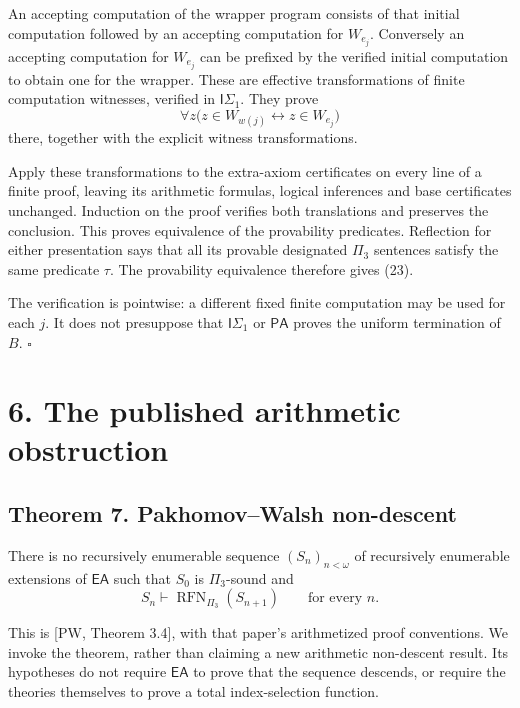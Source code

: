 \documentclass[
  11pt,
  letterpaper,
]{article}
\begin{document}
An accepting computation of the wrapper program consists of that initial
computation followed by an accepting computation for \(W_{e_j}\).
Conversely an accepting computation for \(W_{e_j}\) can be prefixed by
the verified initial computation to obtain one for the wrapper. These
are effective transformations of finite computation witnesses, verified
in \(\mathsf I\Sigma_1\). They prove \[
\forall z\bigl(z\in W_{w(j)}\leftrightarrow z\in W_{e_j}\bigr)
\tag{24}
\] there, together with the explicit witness transformations.

Apply these transformations to the extra-axiom certificates on every
line of a finite proof, leaving its arithmetic formulas, logical
inferences and base certificates unchanged. Induction on the proof
verifies both translations and preserves the conclusion. This proves
equivalence of the provability predicates. Reflection for either
presentation says that all its provable designated \(\Pi_3\) sentences
satisfy the same predicate \(\tau\). The provability equivalence
therefore gives (23).

The verification is pointwise: a different fixed finite computation may
be used for each \(j\). It does not presuppose that
\(\mathsf I\Sigma_1\) or \(\mathsf{PA}\) proves the uniform termination
of \(B\). \hfill\(\square\)

\section{6. The published arithmetic
obstruction}\label{the-published-arithmetic-obstruction}

\subsection{Theorem 7. Pakhomov--Walsh
non-descent}\label{theorem-7.-pakhomovwalsh-non-descent}

There is no recursively enumerable sequence \((S_n)_{n<\omega}\) of
recursively enumerable extensions of \(\mathsf{EA}\) such that \(S_0\)
is \(\Pi_3\)-sound and \[
S_n\vdash\operatorname{RFN}_{\Pi_3}(S_{n+1})
\qquad\text{for every }n.
\tag{25}
\]

This is {[}PW, Theorem 3.4{]}, with that paper's arithmetized proof
conventions. We invoke the theorem, rather than claiming a new
arithmetic non-descent result. Its hypotheses do not require
\(\mathsf{EA}\) to prove that the sequence descends, or require the
theories themselves to prove a total index-selection function.
\end{document}
